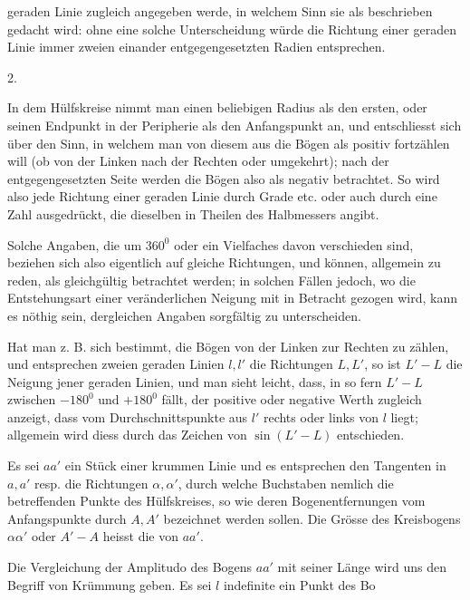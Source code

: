 %
geraden Linie zugleich angegeben werde, in welchem Sinn sie als beschrieben gedacht wird: ohne eine solche Unterscheidung würde die Richtung einer geraden Linie immer zweien einander entgegengesetzten Radien entsprechen.

\begin{center}2.\end{center}
\noindent\hspace*{1.2em}In dem Hülfskreise nimmt man einen beliebigen Radius als den ersten, oder seinen Endpunkt in der Peripherie als den Anfangspunkt an, und entschliesst sich über den Sinn, in welchem man von diesem aus die Bögen als positiv fortzählen will (ob von der Linken nach der Rechten oder umgekehrt); nach der entgegengesetzten Seite werden die Bögen also als negativ betrachtet. So wird also jede Richtung einer geraden Linie durch Grade etc. oder auch durch eine Zahl ausgedrückt, die dieselben in Theilen des Halbmessers angibt.

Solche Angaben, die um $360^{0}$ oder ein Vielfaches davon verschieden sind, beziehen sich also eigentlich auf gleiche Richtungen, und können, allgemein zu reden, als gleichgültig betrachtet werden; in solchen Fällen jedoch, wo die Entstehungsart einer veränderlichen Neigung mit in Betracht gezogen wird, kann es nöthig sein, dergleichen Angaben sorgfältig zu unterscheiden.

Hat man z. B. sich bestimmt, die Bögen von der Linken zur Rechten zu zählen, und entsprechen zweien geraden Linien $l,l'$ die Richtungen $L,L'$, so ist $L'-L$ die Neigung jener geraden Linien, und man sieht leicht, dass, in so fern $L'-L$ zwischen $-180^{0}$ und $+180^{0}$ fällt, der positive oder negative Werth zugleich anzeigt, dass vom Durchschnittspunkte aus $l'$ rechts oder links von $l$ liegt; allgemein wird diess durch das Zeichen von $\sin(L'-L)$ entschieden.

Es sei $aa'$ ein Stück einer krummen Linie und es entsprechen den Tangenten in $a,a'$ resp. die Richtungen $\alpha,\alpha'$, durch welche Buchstaben nemlich die betreffenden Punkte des Hülfskreises, so wie deren Bogenentfernungen vom Anfangspunkte durch $A,A'$ bezeichnet werden sollen. Die Grösse des Kreisbogens $\alpha\alpha'$ oder $A'-A$ heisst die  von $aa'$.

Die Vergleichung der Amplitudo des Bogens $aa'$ mit seiner Länge wird uns den Begriff von Krümmung geben. Es sei $l$ indefinite ein Punkt des Bo%
